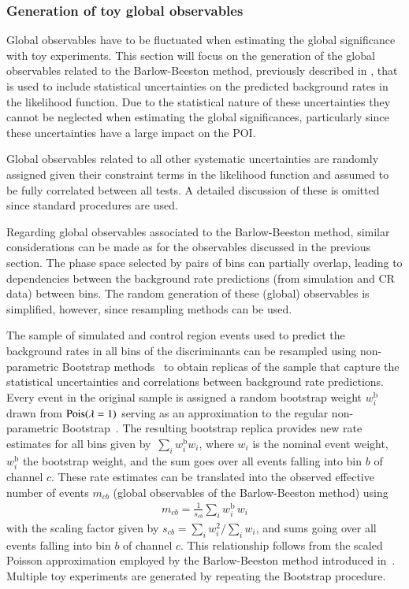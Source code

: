 \subsubsection{Generation of toy global observables}%
\label{sec:toys_global_observables}

Global observables have to be fluctuated when estimating the global
significance with toy experiments. This section will focus on the
generation of the global observables related to the Barlow-Beeston
method, previously described in , that is
used to include statistical uncertainties on the predicted background
rates in the likelihood function. Due to the statistical nature of
these uncertainties they cannot be neglected when estimating the
global significances, particularly since these uncertainties have a
large impact on the POI.

Global observables related to all other systematic uncertainties are
randomly assigned given their constraint terms in the likelihood
function and assumed to be fully correlated between all tests. A
detailed discussion of these is omitted since standard procedures are
used.

Regarding global observables associated to the Barlow-Beeston method,
similar considerations can be made as for the observables discussed in
the previous section. The phase space selected by pairs of bins can
partially overlap, leading to dependencies between the background rate
predictions (from simulation and CR data) between bins. The random
generation of these (global) observables is simplified, however, since
resampling methods can be used.

The sample of simulated and control region events used to predict the
background rates in all bins of the discriminants can be resampled
using non-parametric Bootstrap
methods~\cite{10.1214/aos/1176344552,efron1994introduction} to obtain
replicas of the sample that capture the statistical uncertainties and
correlations between background rate predictions. Every event in the
original sample is assigned a random bootstrap weight $w_i^{\text{b}}$
drawn from $\operatorname{Pois}(\lambda = 1)$ serving as an approximation to the
regular non-parametric
Bootstrap~\cite{google:poisson,ATL-PHYS-PUB-2021-011}. The resulting
bootstrap replica provides new rate estimates for all bins given
by~$\sum_{i} w_{i}^{\text{b}} w_i$, where $w_i$ is the nominal event
weight, $w_i^{\text{b}}$ the bootstrap weight, and the sum goes over
all events falling into bin $b$ of channel $c$. These rate estimates
can be translated into the observed effective number of events
$m_{cb}$ (global observables of the Barlow-Beeston method) using
\begin{align*}
  m_{cb} = \frac{1}{s_{cb}} \sum_{i} w_{i}^{\text{b}} \, w_i
\end{align*}
with the scaling factor given by $s_{cb} = \sum_i w_i^2 / \sum_i w_i$,
and sums going over all events falling into bin $b$ of channel
$c$. This relationship follows from the scaled Poisson approximation
employed by the Barlow-Beeston method introduced
in~. Multiple toy experiments are generated
by repeating the Bootstrap procedure.

